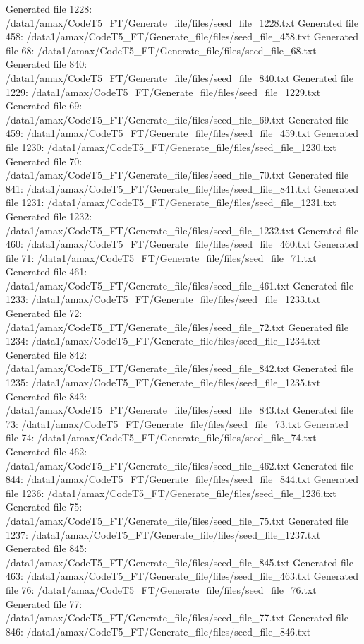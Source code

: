 Generated file 1228: /data1/amax/CodeT5_FT/Generate_file/files/seed_file_1228.txt
Generated file 458: /data1/amax/CodeT5_FT/Generate_file/files/seed_file_458.txt
Generated file 68: /data1/amax/CodeT5_FT/Generate_file/files/seed_file_68.txt
Generated file 840: /data1/amax/CodeT5_FT/Generate_file/files/seed_file_840.txt
Generated file 1229: /data1/amax/CodeT5_FT/Generate_file/files/seed_file_1229.txt
Generated file 69: /data1/amax/CodeT5_FT/Generate_file/files/seed_file_69.txt
Generated file 459: /data1/amax/CodeT5_FT/Generate_file/files/seed_file_459.txt
Generated file 1230: /data1/amax/CodeT5_FT/Generate_file/files/seed_file_1230.txt
Generated file 70: /data1/amax/CodeT5_FT/Generate_file/files/seed_file_70.txt
Generated file 841: /data1/amax/CodeT5_FT/Generate_file/files/seed_file_841.txt
Generated file 1231: /data1/amax/CodeT5_FT/Generate_file/files/seed_file_1231.txt
Generated file 1232: /data1/amax/CodeT5_FT/Generate_file/files/seed_file_1232.txt
Generated file 460: /data1/amax/CodeT5_FT/Generate_file/files/seed_file_460.txt
Generated file 71: /data1/amax/CodeT5_FT/Generate_file/files/seed_file_71.txt
Generated file 461: /data1/amax/CodeT5_FT/Generate_file/files/seed_file_461.txt
Generated file 1233: /data1/amax/CodeT5_FT/Generate_file/files/seed_file_1233.txt
Generated file 72: /data1/amax/CodeT5_FT/Generate_file/files/seed_file_72.txt
Generated file 1234: /data1/amax/CodeT5_FT/Generate_file/files/seed_file_1234.txt
Generated file 842: /data1/amax/CodeT5_FT/Generate_file/files/seed_file_842.txt
Generated file 1235: /data1/amax/CodeT5_FT/Generate_file/files/seed_file_1235.txt
Generated file 843: /data1/amax/CodeT5_FT/Generate_file/files/seed_file_843.txt
Generated file 73: /data1/amax/CodeT5_FT/Generate_file/files/seed_file_73.txt
Generated file 74: /data1/amax/CodeT5_FT/Generate_file/files/seed_file_74.txt
Generated file 462: /data1/amax/CodeT5_FT/Generate_file/files/seed_file_462.txt
Generated file 844: /data1/amax/CodeT5_FT/Generate_file/files/seed_file_844.txt
Generated file 1236: /data1/amax/CodeT5_FT/Generate_file/files/seed_file_1236.txt
Generated file 75: /data1/amax/CodeT5_FT/Generate_file/files/seed_file_75.txt
Generated file 1237: /data1/amax/CodeT5_FT/Generate_file/files/seed_file_1237.txt
Generated file 845: /data1/amax/CodeT5_FT/Generate_file/files/seed_file_845.txt
Generated file 463: /data1/amax/CodeT5_FT/Generate_file/files/seed_file_463.txt
Generated file 76: /data1/amax/CodeT5_FT/Generate_file/files/seed_file_76.txt
Generated file 77: /data1/amax/CodeT5_FT/Generate_file/files/seed_file_77.txt
Generated file 846: /data1/amax/CodeT5_FT/Generate_file/files/seed_file_846.txt
